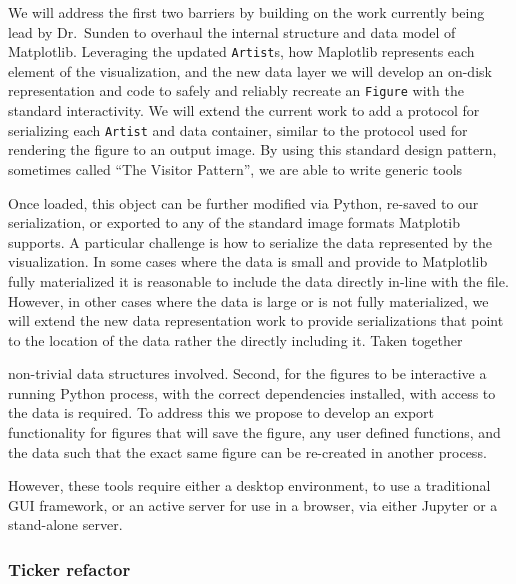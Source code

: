 \documentclass[12pt]{article}
\numberwithin{page}{section}
\begin{document}
%


We will address the first two barriers by building on the work currently being
lead by Dr.\ Sunden to overhaul the internal structure and data model of
Matplotlib.  Leveraging the updated \texttt{Artist}s, how Maplotlib represents
each element of the visualization, and the new data layer we will develop an
on-disk representation and code to safely and reliably recreate an
\texttt{Figure} with the standard interactivity.  We will extend the current work to
add a protocol for serializing each \texttt{Artist} and data container, similar to
the protocol used for rendering the figure to an output image.  By using this standard
design pattern, sometimes called ``The Visitor Pattern'', we are able to write generic tools

Once loaded, this object can
be further modified via Python, re-saved to our serialization, or exported to
any of the standard image formats Matplotib supports.  A particular challenge
is how to serialize the data represented by the visualization.  In some cases
where the data is small and provide to Matplotlib fully materialized it is
reasonable to include the data directly in-line with the file.  However, in
other cases where the data is large or is not fully materialized, we will
extend the new data representation work to provide serializations that point to
the location of the data rather the directly including it.  Taken together

non-trivial data structures involved.  Second, for the figures to
be interactive a running Python process, with the correct dependencies
installed, with access to the data is required.  To address this we propose to
develop an export functionality for figures that will save the figure, any user
defined functions, and the data such that the exact same figure can be
re-created in another process.

However, these tools
require either a desktop environment, to use a traditional GUI framework, or an
active server for use in a browser, via either Jupyter or a stand-alone server.


\subsubsection{Ticker refactor}
\end{document}

